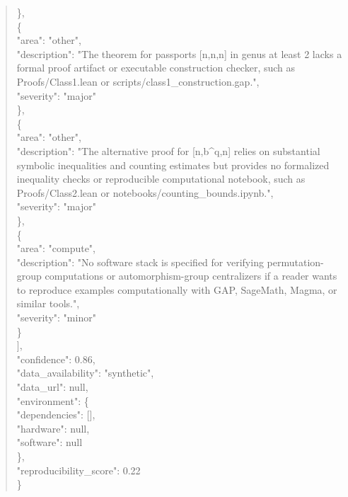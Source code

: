 \documentclass[11pt]{article}
\begin{document}
\begin{quote}
    \},\\
    \{\\
      "area": "other",\\
      "description": "The theorem for passports [n,n,n] in genus at least 2 lacks a formal proof artifact or executable construction checker, such as Proofs/Class1.lean or scripts/class1\_construction.gap.",\\
      "severity": "major"\\
    \},\\
    \{\\
      "area": "other",\\
      "description": "The alternative proof for [n,b\^{}q,n] relies on substantial symbolic inequalities and counting estimates but provides no formalized inequality checks or reproducible computational notebook, such as Proofs/Class2.lean or notebooks/counting\_bounds.ipynb.",\\
      "severity": "major"\\
    \},\\
    \{\\
      "area": "compute",\\
      "description": "No software stack is specified for verifying permutation-group computations or automorphism-group centralizers if a reader wants to reproduce examples computationally with GAP, SageMath, Magma, or similar tools.",\\
      "severity": "minor"\\
    \}\\
  ],\\
  "confidence": 0.86,\\
  "data\_availability": "synthetic",\\
  "data\_url": null,\\
  "environment": \{\\
    "dependencies": [],\\
    "hardware": null,\\
    "software": null\\
  \},\\
  "reproducibility\_score": 0.22\\
\}\\
\end{quote}
\end{document}
